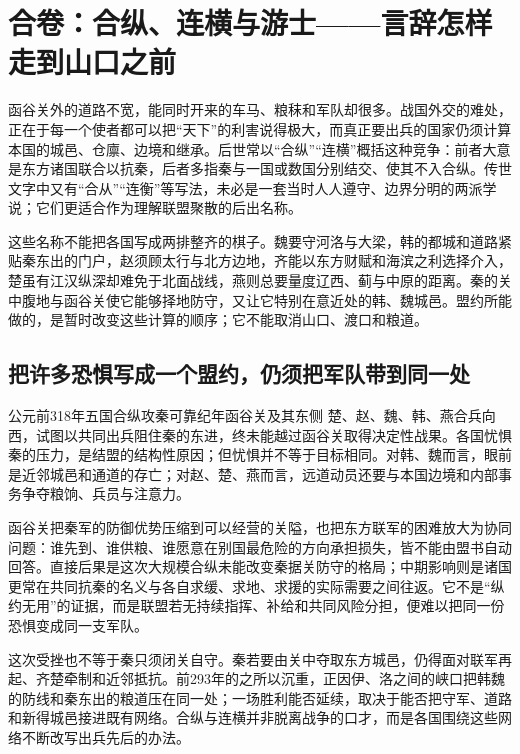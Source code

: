 \section{合卷：合纵、连横与游士——言辞怎样走到山口之前}

函谷关外的道路不宽，能同时开来的车马、粮秣和军队却很多。战国外交的难处，正在于每一个使者都可以把“天下”的利害说得极大，而真正要出兵的国家仍须计算本国的城邑、仓廪、边境和继承。后世常以“合纵”“连横”概括这种竞争：前者大意是东方诸国联合以抗秦，后者多指秦与一国或数国分别结交、使其不入合纵。传世文字中又有“合从”“连衡”等写法，未必是一套当时人人遵守、边界分明的两派学说；它们更适合作为理解联盟聚散的后出名称。

这些名称不能把各国写成两排整齐的棋子。魏要守河洛与大梁，韩的都城和道路紧贴秦东出的门户，赵须顾太行与北方边地，齐能以东方财赋和海滨之利选择介入，楚虽有江汉纵深却难免于北面战线，燕则总要量度辽西、蓟与中原的距离。秦的关中腹地与函谷关使它能够择地防守，又让它特别在意近处的韩、魏城邑。盟约所能做的，是暂时改变这些计算的顺序；它不能取消山口、渡口和粮道。

\subsection{把许多恐惧写成一个盟约，仍须把军队带到同一处}

\begin{event}{公元前318年}{五国合纵攻秦}{可靠纪年}{函谷关及其东侧}
楚、赵、魏、韩、燕合兵向西，试图以共同出兵阻住秦的东进，终未能越过函谷关取得决定性战果。各国忧惧秦的压力，是结盟的结构性原因；但忧惧并不等于目标相同。对韩、魏而言，眼前是近邻城邑和通道的存亡；对赵、楚、燕而言，远道动员还要与本国边境和内部事务争夺粮饷、兵员与注意力。

函谷关把秦军的防御优势压缩到可以经营的关隘，也把东方联军的困难放大为协同问题：谁先到、谁供粮、谁愿意在别国最危险的方向承担损失，皆不能由盟书自动回答。直接后果是这次大规模合纵未能改变秦据关防守的格局；中期影响则是诸国更常在共同抗秦的名义与各自求缓、求地、求援的实际需要之间往返。它不是“纵约无用”的证据，而是联盟若无持续指挥、补给和共同风险分担，便难以把同一份恐惧变成同一支军队。
\end{event}

这次受挫也不等于秦只须闭关自守。秦若要由关中夺取东方城邑，仍得面对联军再起、齐楚牵制和近邻抵抗。前293年的之所以沉重，正因伊、洛之间的峡口把韩魏的防线和秦东出的粮道压在同一处；一场胜利能否延续，取决于能否把守军、道路和新得城邑接进既有网络。合纵与连横并非脱离战争的口才，而是各国围绕这些网络不断改写出兵先后的办法。

